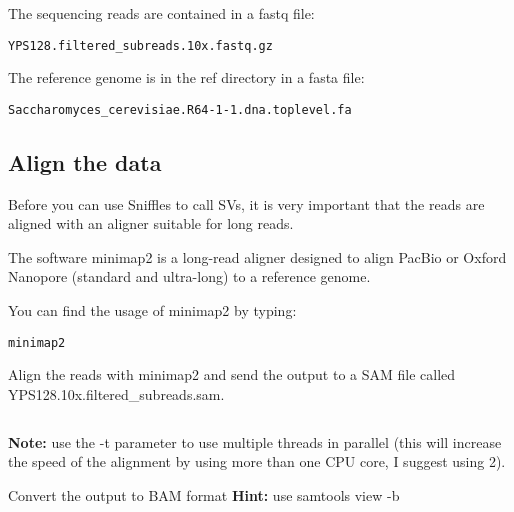 \documentclass[11pt]{article}
\makeatletter
\newcommand{\boxspacing}{\kern\kvtcb@left@rule\kern\kvtcb@boxsep}
\newcommand{\prompt}[4]{
        {\ttfamily\llap{{\color{#2}[#3]:\hspace{3pt}#4}}\vspace{-\baselineskip}}
    }
\makeatother
\begin{document}
The sequencing reads are contained in a fastq file:

\texttt{YPS128.filtered\_subreads.10x.fastq.gz}

The reference genome is in the ref directory in a fasta file:

\texttt{Saccharomyces\_cerevisiae.R64-1-1.dna.toplevel.fa}

    \hypertarget{align-the-data}{%
\subsection{Align the data}\label{align-the-data}}

Before you can use Sniffles to call SVs, it is very important that the
reads are aligned with an aligner suitable for long reads.

The software minimap2 is a long-read aligner designed to align PacBio or
Oxford Nanopore (standard and ultra-long) to a reference genome.

You can find the usage of minimap2 by typing:

    \begin{tcolorbox}[breakable, size=fbox, boxrule=1pt, pad at break*=1mm,colback=cellbackground, colframe=cellborder]
\prompt{In}{incolor}{ }{\boxspacing}
\begin{Verbatim}[commandchars=\\\{\}]
minimap2
\end{Verbatim}
\end{tcolorbox}

    Align the reads with minimap2 and send the output to a SAM file called
YPS128.10x.filtered\_subreads.sam.

    \begin{tcolorbox}[breakable, size=fbox, boxrule=1pt, pad at break*=1mm,colback=cellbackground, colframe=cellborder]
\prompt{In}{incolor}{ }{\boxspacing}
\begin{Verbatim}[commandchars=\\\{\}]

\end{Verbatim}
\end{tcolorbox}

    \textbf{Note:} use the -t parameter to use multiple threads in parallel
(this will increase the speed of the alignment by using more than one
CPU core, I suggest using 2).

    Convert the output to BAM format \textbf{Hint:} use samtools view -b

    \begin{tcolorbox}[breakable, size=fbox, boxrule=1pt, pad at break*=1mm,colback=cellbackground, colframe=cellborder]
\prompt{In}{incolor}{ }{\boxspacing}
\begin{Verbatim}[commandchars=\\\{\}]

\end{Verbatim}
\end{tcolorbox}
\end{document}
